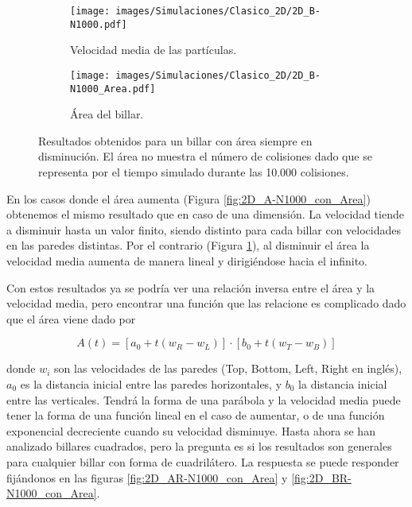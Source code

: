 \begin{figure}[!h]
    \begin{subfigure}[b]{0.5\textwidth}
        \centering
        \texttt{[image: images/Simulaciones/Clasico\_2D/2D\_B-N1000.pdf]}
        \caption{Velocidad media de las partículas.}
    \end{subfigure}
    \hfill
    \begin{subfigure}[b]{0.5\textwidth}
        \centering
        \texttt{[image: images/Simulaciones/Clasico\_2D/2D\_B-N1000\_Area.pdf]}
        \caption{Área del billar.}
    \end{subfigure}
    \caption{Resultados obtenidos para un billar con área siempre en disminución. El área no muestra el número de colisiones dado que se representa por el tiempo simulado durante las 10.000 colisiones.}
    \label{fig:2D_B-N1000_con_Area}
\end{figure}

En los casos donde el área aumenta (Figura \ref{fig:2D_A-N1000_con_Area}) obtenemos el mismo resultado que en caso de una dimensión. La velocidad tiende a disminuir hasta un valor finito, siendo distinto para cada billar con velocidades en las paredes distintas. Por el contrario (Figura \ref{fig:2D_B-N1000_con_Area}), al disminuir el área la velocidad media aumenta de manera lineal y dirigiéndose hacia el infinito. 

\vspace{3mm}

Con estos resultados ya se podría ver una relación inversa entre el área y la velocidad media, pero encontrar una función que las relacione es complicado dado que el área viene dado por 

\begin{equation}\label{eq:area}
    A(t) = \left[ a_0 + t (w_R - w_L) \right] \cdot \left[ b_0 + t (w_T - w_B) \right]
\end{equation}

donde \( w_i \) son las velocidades de las paredes (Top, Bottom, Left, Right en inglés), \( a_0 \) es la distancia inicial entre las paredes horizontales, y \( b_0 \) la distancia inicial entre las verticales. Tendrá la forma de una parábola y la velocidad media puede tener la forma de una función lineal en el caso de aumentar, o de una función exponencial decreciente cuando su velocidad disminuye. Hasta ahora se han analizado billares cuadrados, pero la pregunta es si los resultados son generales para cualquier billar con forma de cuadrilátero. La respuesta se puede responder fijándonos en las figuras \ref{fig:2D_AR-N1000_con_Area} y \ref{fig:2D_BR-N1000_con_Area}. 

